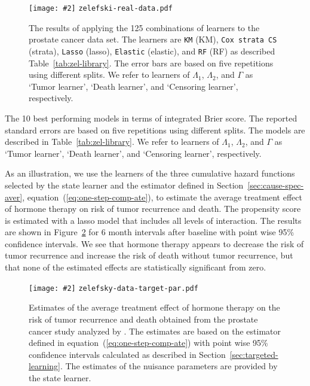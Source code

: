 \documentclass{statsoc}
\newcommand{\includeFigCond}[2][]{
  \ifx\nofig\undefined %
    \texttt{[image: \#2]} %
  \else %
    \texttt{#2} %
  \fi %
}
\newcommand{\1}{\mathds{1}}
\begin{document}
\begin{figure}
  \centering %
  \includeFigCond[width=1\linewidth]{zelefski-real-data.pdf}
  \caption[]{The results of applying the 125 combinations of learners to the
    prostate cancer data set. The learners are \texttt{KM} (KM), \texttt{Cox
      strata CS} (strata), \texttt{Lasso} (lasso), \texttt{Elastic} (elastic),
    and \texttt{RF} (RF) as described Table~\ref{tab:zel-library}. The error
    bars are based on five repetitions using different splits. We refer to
    learners of \( \Lambda_1 \), \( \Lambda_2 \), and $\Gamma$ as `Tumor
    learner', `Death learner', and `Censoring learner', respectively.}
  \label{fig:zelefski-real}
\end{figure}


\begin{table}
  \caption{\label{tab:zelefski-real}The 10 best performing models in terms of integrated Brier score. The
    reported standard errors are based on five repetitions using different
    splits. The models are described in Table~\ref{tab:zel-library}. We refer to
    learners of \( \Lambda_1 \), \( \Lambda_2 \), and $\Gamma$ as `Tumor
    learner', `Death learner', and `Censoring learner', respectively.}
  \centering
  
\end{table}



As an illustration, we use the learners of the three cumulative hazard functions
selected by the state learner and the estimator defined in
Section~\ref{sec:cause-spec-aver}, equation~(\ref{eq:one-step-comp-ate}), to
estimate the average treatment effect of hormone therapy on risk of tumor
recurrence and death. The propensity score is estimated with a lasso model that
includes all levels of interaction. The results are shown in
Figure~\ref{fig:zelefski-real-target} for 6 month intervals after baseline with
point wise 95\% confidence intervals. We see that hormone therapy appears to
decrease the risk of tumor recurrence and increase the risk of death without
tumor recurrence, but that none of the estimated effects are statistically
significant from zero.

\begin{figure}
  \centering%
  \includeFigCond[width=1\linewidth]{zelefsky-data-target-par.pdf}
  \caption[]{Estimates of the average treatment effect of hormone therapy on the
    risk of tumor recurrence and death obtained from the prostate cancer study
    analyzed by \cite{kattan2000pretreatment}. The estimates are based on the
    estimator defined in equation~(\ref{eq:one-step-comp-ate}) with point wise
    95\% confidence intervals calculated as described in
    Section~\ref{sec:targeted-learning}. The estimates of the nuisance
    parameters are provided by the state learner.}
  \label{fig:zelefski-real-target}
\end{figure}
\end{document}
